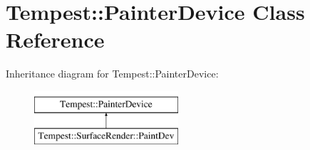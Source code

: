 \hypertarget{class_tempest_1_1_painter_device}{\section{Tempest\+:\+:Painter\+Device Class Reference}
\label{class_tempest_1_1_painter_device}
}
Inheritance diagram for Tempest\+:\+:Painter\+Device\+:\begin{figure}[H]
\begin{center}
\leavevmode
\includegraphics[height=2.000000cm]{class_tempest_1_1_painter_device}
\end{center}
\end{figure}
